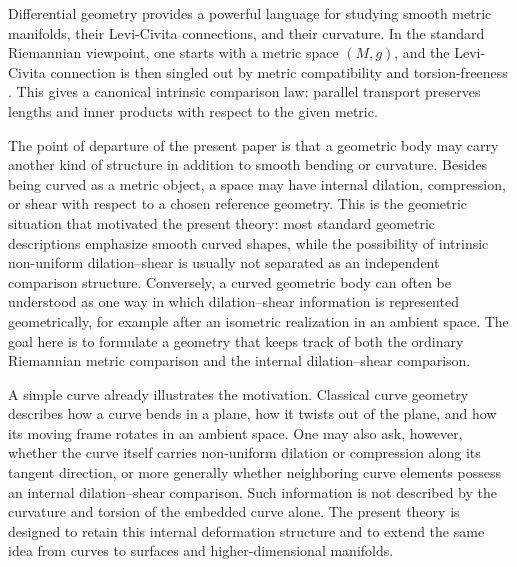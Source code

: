 \documentclass[12pt]{amsart}
\theoremstyle{definition}
\theoremstyle{remark}
\begin{document}
Differential geometry provides a powerful language for studying smooth metric manifolds, their Levi-Civita connections, and their curvature.  In the standard Riemannian viewpoint, one starts with a metric space \((M,g)\), and the Levi-Civita connection is then singled out by metric compatibility and torsion-freeness \cite[pp.~124--126]{Lee}\cite[pp.~54--55]{doCarmo}.  This gives a canonical intrinsic comparison law: parallel transport preserves lengths and inner products with respect to the given metric.

The point of departure of the present paper is that a geometric body may carry another kind of structure in addition to smooth bending or curvature.  Besides being curved as a metric object, a space may have internal dilation, compression, or shear with respect to a chosen reference geometry.  This is the geometric situation that motivated the present theory: most standard geometric descriptions emphasize smooth curved shapes, while the possibility of intrinsic non-uniform dilation--shear is usually not separated as an independent comparison structure.  Conversely, a curved geometric body can often be understood as one way in which dilation--shear information is represented geometrically, for example after an isometric realization in an ambient space.  The goal here is to formulate a geometry that keeps track of both the ordinary Riemannian metric comparison and the internal dilation--shear comparison.

A simple curve already illustrates the motivation.  Classical curve geometry describes how a curve bends in a plane, how it twists out of the plane, and how its moving frame rotates in an ambient space.  One may also ask, however, whether the curve itself carries non-uniform dilation or compression along its tangent direction, or more generally whether neighboring curve elements possess an internal dilation--shear comparison.  Such information is not described by the curvature and torsion of the embedded curve alone.  The present theory is designed to retain this internal deformation structure and to extend the same idea from curves to surfaces and higher-dimensional manifolds.
\end{document}
